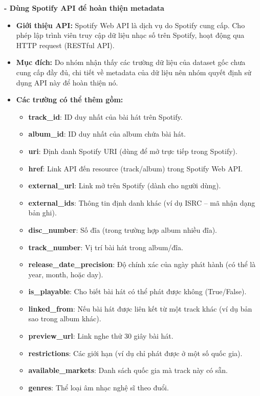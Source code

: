  \textbf{- Dùng Spotify API để hoàn thiện metadata}
 \\ 
 \begin{itemize}
     \item \textbf{Giới thiệu API:} Spotify Web API là dịch vụ do Spotify cung cấp. Cho phép lập trình viên truy cập dữ liệu nhạc số trên Spotify, hoạt động qua HTTP request (RESTful API). 
     \item \textbf{Mục đích:} Do nhóm nhận thấy các trường dữ liệu của dataset gốc chưa cung cấp đầy đủ, chi tiết về metadata của dữ liệu nên nhóm quyết định sử dụng API này để hoàn thiện nó.
     \item \textbf{Các trường có thể thêm gồm:}
    \begin{itemize}
        \item \textbf{track\_id}: ID duy nhất của bài hát trên Spotify.
        \item \textbf{album\_id}: ID duy nhất của album chứa bài hát.
        \item \textbf{uri}: Định danh Spotify URI (dùng để mở trực tiếp trong Spotify).
        \item \textbf{href}: Link API đến resource (track/album) trong Spotify Web API.
        \item \textbf{external\_url}: Link mở trên Spotify (dành cho người dùng).
        \item \textbf{external\_ids}: Thông tin định danh khác (ví dụ ISRC – mã nhận dạng bản ghi).
        \item \textbf{disc\_number}: Số đĩa (trong trường hợp album nhiều đĩa).
        \item \textbf{track\_number}: Vị trí bài hát trong album/đĩa.
        \item \textbf{release\_date\_precision}: Độ chính xác của ngày phát hành (có thể là year, month, hoặc day).
        \item \textbf{is\_playable}: Cho biết bài hát có thể phát được không (True/False).
        \item \textbf{linked\_from}: Nếu bài hát được liên kết từ một track khác (ví dụ bản sao trong album khác).
        \item \textbf{preview\_url}: Link nghe thử 30 giây bài hát.
        \item \textbf{restrictions}: Các giới hạn (ví dụ chỉ phát được ở một số quốc gia).
        \item \textbf{available\_markets}: Danh sách quốc gia mà track này có sẵn.
        \item \textbf{genres}: Thể loại âm nhạc nghệ sĩ theo đuổi.
    \end{itemize}
 \end{itemize}
 
